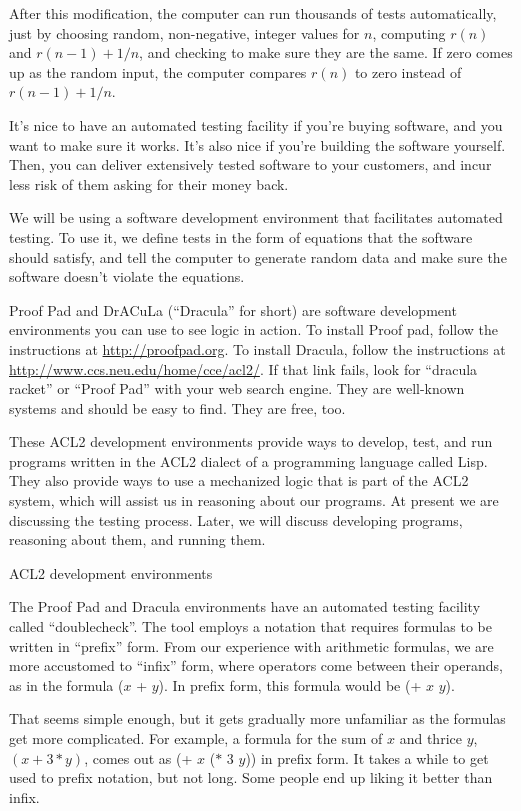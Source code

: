 After this modification, the computer can run thousands of tests automatically,
just by choosing random, non-negative, integer values for $n$,
computing $r(n)$ and $r(n-1) + 1/n$,
and checking to make sure they are the same.
If zero comes up as the random input,
the computer compares $r(n)$ to zero instead of
$r(n-1) + 1/n$.

It's nice to have an automated testing facility if you're buying software,
and you want to make sure it works.
It's also nice if you're building the software yourself.
Then, you can deliver extensively tested software to your customers,
and incur less risk of them asking for their money back.

We will be using a software development environment that facilitates automated testing.
To use it, we define tests in the form of equations that the software should satisfy,
and tell the computer to generate random data and make sure the software
doesn't violate the equations.

\begin{aside}
Proof Pad and
DrACuLa (``Dracula'' for short) are software development environments
you can use to see logic in action.
To install Proof pad, follow the instructions at \url{http://proofpad.org}.
To install Dracula, follow the instructions at
\url{http://www.ccs.neu.edu/home/cce/acl2/}.
If that link fails, look for ``dracula racket'' or ``Proof Pad''
with your web search engine.
They are well-known systems and should be easy to find.
They are free, too.

These ACL2 development environments provide ways to develop, test, and run programs
written in the ACL2 dialect of a programming language called Lisp.
They also provide ways to use a mechanized logic that is part of the ACL2 system,
which will assist us in reasoning about our programs.
At present we are discussing the testing process.
Later, we will discuss developing programs, reasoning about them, and running them.
\caption{ACL2 development environments}
\label{dracula}
\end{aside}

The Proof Pad and Dracula environments have
an automated testing facility called ``doublecheck''.
The tool employs a notation that requires formulas to be written in ``prefix'' form.
From our experience with arithmetic formulas, we are more accustomed to ``infix'' form,
where operators come between their operands, as in the formula ($x$ + $y$).
In prefix form, this formula would be (+ $x$ $y$).

That seems simple enough, but it gets gradually more unfamiliar
as the formulas get more complicated.
For example, a formula for the sum of $x$ and thrice $y$, $(x + 3*y)$,
comes out as (+ $x$ ($*$ $3$ $y$)) in prefix form.
It takes a while to get used to prefix notation, but not long.
Some people end up liking it better than infix.

